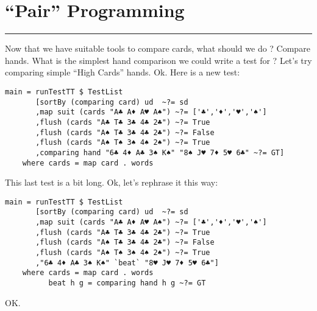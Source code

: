 \newpage
\section{``Pair'' Programming} 
\vspace{10cm}
\hrule

\lhQ Now that we have suitable tools to compare cards, what should we do ?
\lhA Compare hands.
\lhN What is the simplest hand comparison we could write a test for ?
\lhA Let's try comparing simple ``High Cards'' hands.
\lhN Ok. Here is a new test:
\begin{lstlisting}[frame=single]
main = runTestTT $ TestList 
       [sortBy (comparing card) ud  ~?= sd
       ,map suit (cards "A♣ A♦ A♥ A♠") ~?= ['♣','♦','♥','♠']
       ,flush (cards "A♣ T♣ 3♣ 4♣ 2♣") ~?= True
       ,flush (cards "A♠ T♣ 3♣ 4♣ 2♣") ~?= False
       ,flush (cards "A♠ T♠ 3♠ 4♠ 2♠") ~?= True
       ,comparing hand "6♣ 4♦ A♣ 3♠ K♠" "8♠ J♥ 7♦ 5♥ 6♣" ~?= GT]
    where cards = map card . words 
\end{lstlisting} %
\hspace*{\fill}
\lhA This last test is a bit long.
\lhN Ok, let's rephrase it this way:
\begin{lstlisting}[frame=single]
main = runTestTT $ TestList 
       [sortBy (comparing card) ud  ~?= sd
       ,map suit (cards "A♣ A♦ A♥ A♠") ~?= ['♣','♦','♥','♠']
       ,flush (cards "A♣ T♣ 3♣ 4♣ 2♣") ~?= True
       ,flush (cards "A♠ T♣ 3♣ 4♣ 2♣") ~?= False
       ,flush (cards "A♠ T♠ 3♠ 4♠ 2♠") ~?= True
       ,"6♣ 4♦ A♣ 3♠ K♠" `beat` "8♥ J♥ 7♦ 5♥ 6♣"]
    where cards = map card . words 
          beat h g = comparing hand h g ~?= GT
\end{lstlisting} %
\hspace*{\fill}
\lhA OK.
\lhend



